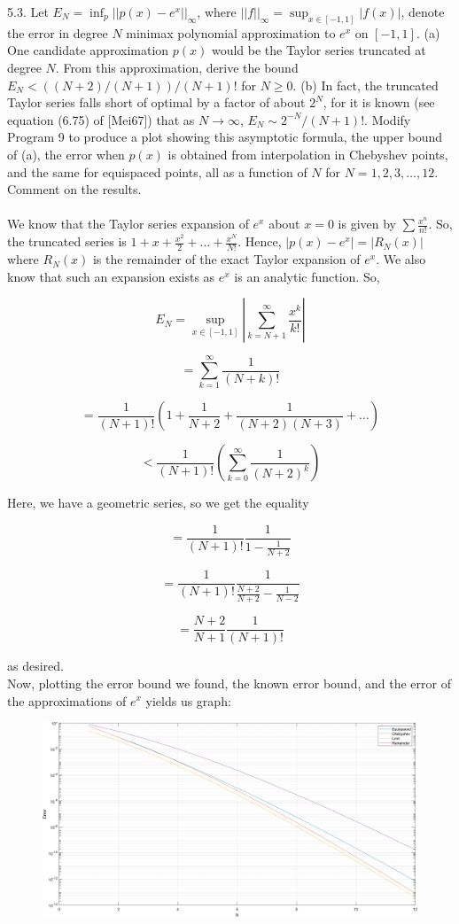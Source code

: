 \documentclass[12pt]{article}
\begin{document}
\newpage

\newpage

\newpage

5.3. Let $E_N = \inf_p||p(x)-e^x||_{\infty}$, where $||f||_{\infty}=\sup_{x\in[-1,1]}|f (x)|$, denote the error in
degree $N$ minimax polynomial approximation to $e^x$ on $[-1, 1]$. (a) One candidate approximation $p(x)$ would be
the Taylor series truncated at degree $N$. From this approximation, derive the bound $E_N<((N + 2)/(N + 1))/(N + 1)!$
for $N\geq0$. (b) In fact, the truncated Taylor series falls short of optimal by a factor of about $2^N$, 
for it is known (see equation (6.75) of [Mei67]) that as $N\rightarrow\infty$, $E_N\sim2^{-N}/(N + 1)!$. Modify
Program 9 to produce a plot showing this asymptotic formula, the upper bound of (a), the error when $p(x)$ is obtained 
from interpolation in Chebyshev points, and the same for equispaced points, all as a function of $N$ for
$N = 1, 2, 3,\ldots,12$. Comment on the results.\\\\

We know that the Taylor series expansion of $e^x$ about $x=0$ is given by $\sum\frac{x^n}{n!}$. So, the truncated
series is $1+x+\frac{x^2}{2}+\ldots+\frac{x^N}{N!}$. Hence, $|p(x)-e^x|=|R_N(x)|$ where $R_N(x)$ is the remainder
of the exact Taylor expansion of $e^x$. We also know that such an expansion exists as $e^x$ is an analytic function.
So,

$$E_N=\sup_{x\in[-1,1]}|\sum_{k=N+1}^{\infty}\frac{x^k}{k!}|$$

$$=\sum_{k=1}^{\infty}\frac{1}{(N+k)!}$$

$$=\frac{1}{(N+1)!}(1+\frac{1}{N+2}+\frac{1}{(N+2)(N+3)}+\dots)$$

$$<\frac{1}{(N+1)!}(\sum_{k=0}^{\infty}\frac{1}{(N+2)^k})$$

Here, we have a geometric series, so we get the equality

$$=\frac{1}{(N+1)!}\frac{1}{1-\frac{1}{N+2}}$$

$$=\frac{1}{(N+1)!}\frac{1}{\frac{N+2}{N+2}-\frac{1}{N-2}}$$

$$=\frac{N+2}{N+1}\frac{1}{(N+1)!}$$

as desired.\\

Now, plotting the error bound we found, the known error bound, and the error of the approximations of $e^x$ yields us
graph:

\begin{figure}[htp]
\centering
\includegraphics[scale=0.12]{5_3_1.PNG}
\end{figure}
\end{document}
